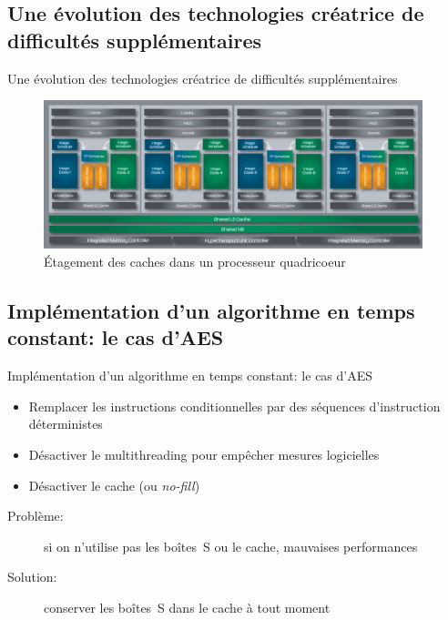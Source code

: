 \documentclass[11pt]{beamer}
\begin{document}
\subsection{Une évolution des technologies créatrice de difficultés supplémentaires}
\begin{frame}{Une évolution des technologies créatrice de difficultés supplémentaires}
\begin{figure}[h]
  \centering
  \includegraphics[width=11cm]{figures/BDArch.png}
  \caption{Étagement des caches dans un processeur quadricoeur}
  \label{etagement} 
\end{figure}
\end{frame}

\subsection{Implémentation d'un algorithme en temps constant: le cas d'AES}
\begin{frame}{Implémentation d'un algorithme en temps constant: le cas d'AES}
\begin{itemize}
\item Remplacer les instructions conditionnelles par des séquences d'instruction déterministes~\cite{kasper2009faster}
\item Désactiver le multithreading pour empêcher mesures logicielles
\item Désactiver le cache (ou \emph{no-fill})
\end{itemize}

\begin{description}
\item [Problème:] si on n'utilise pas les boîtes~S ou le cache, mauvaises performances
\item [Solution:] conserver les boîtes~S dans le cache à tout moment
\end{description}
\end{frame}
\end{document}
